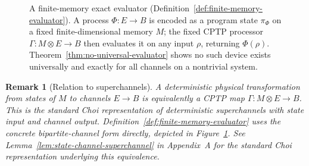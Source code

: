 \documentclass[11pt]{article}
\newtheorem{remark}[theorem]{Remark}
\begin{document}
\begin{figure}[htbp]
\centering
{}
\caption{A finite-memory exact evaluator
(Definition~\ref{def:finite-memory-evaluator}). A process $\Phi:E\to B$ is
encoded as a program state $\pi_\Phi$ on a fixed finite-dimensional memory $M$;
the fixed CPTP processor $\Gamma:M\otimes E\to B$ then evaluates it on any input
$\rho$, returning $\Phi(\rho)$. Theorem~\ref{thm:no-universal-evaluator} shows
no such device exists universally and exactly for all channels on a nontrivial
system.}
\label{fig:evaluator}
\end{figure}

\begin{remark}[Relation to superchannels]
A deterministic physical transformation from states of $M$ to channels
$E\to B$ is equivalently a CPTP map $\Gamma:M\otimes E\to B$. This is the
standard Choi representation of deterministic superchannels with state input
and channel output. Definition~\ref{def:finite-memory-evaluator} uses the
concrete bipartite-channel form directly, depicted in
Figure~\ref{fig:evaluator}. See
Lemma~\ref{lem:state-channel-superchannel} in Appendix~A for the standard
Choi representation underlying this equivalence.
\end{remark}
\end{document}
